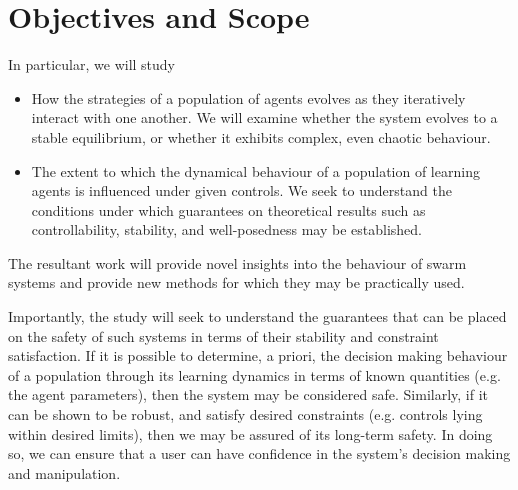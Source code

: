\documentclass[.../main.tex]{subfiles}
\begin{document}
    \section{Objectives and Scope} \label{sec::Objectives_and_Scope}

    In particular, we will study

    \begin{itemize}
    	\item How the strategies of a population of agents evolves as they iteratively interact
    	with one another. We will examine whether the system evolves to a stable equilibrium, or
    	whether it exhibits complex, even chaotic behaviour.
    	\item The extent to which the dynamical behaviour of a population of learning agents is
    	influenced under given controls. We seek to understand the conditions under which guarantees
    	on theoretical results such as controllability, stability, and well-posedness may be
    	established.
    \end{itemize}

    The resultant work will provide novel insights into the behaviour of swarm systems and provide
    new methods for which they may be practically used. 

    Importantly, the study will seek to understand the guarantees that can be
    placed on the safety of such systems in terms of their stability and
    constraint satisfaction. If it is possible to determine, a priori, the decision making
    behaviour of a population through its learning dynamics in terms of known quantities (e.g. the
    agent parameters), then the system may be considered safe. Similarly, if it can be shown
    to be robust, and satisfy desired constraints (e.g. controls lying within desired limits), then
    we may be assured of its long-term safety. In doing so, we can ensure
    that a user can have confidence in the system's decision making and manipulation.
\end{document}

